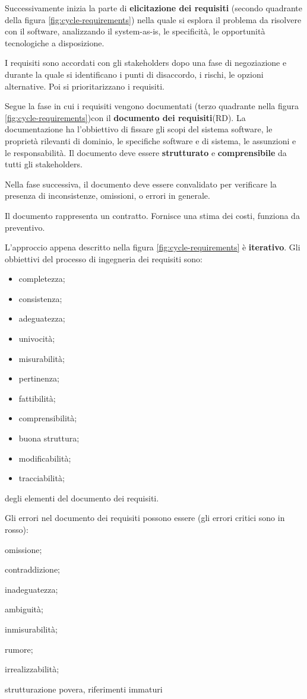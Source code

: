\documentclass[italian]{article}
\begin{document}
		 Successivamente inizia la parte di \textbf{elicitazione dei requisiti} (secondo quadrante della figura \ref{fig:cycle-requirements}) nella quale si esplora il problema da risolvere con il software, analizzando il system-as-is, le specificità, le opportunità tecnologiche a disposizione.

		 I requisiti sono accordati con gli stakeholders dopo una fase di negoziazione e durante la quale si identificano i punti di disaccordo, i rischi, le opzioni alternative. Poi si prioritarizzano i requisiti.

		 Segue la fase in cui i requisiti vengono documentati (terzo quadrante nella figura \ref{fig:cycle-requirements})con il \textbf{documento dei requisiti}(RD). La documentazione ha l'obbiettivo di fissare gli scopi del sistema software, le proprietà rilevanti di dominio, le specifiche software e di sistema, le assunzioni e le responsabilità. Il documento deve essere \textbf{strutturato} e \textbf{comprensibile} da tutti gli stakeholders.

		 Nella fase successiva, il documento deve essere convalidato per verificare la presenza di inconsistenze, omissioni, o errori in generale.

		 Il documento rappresenta un contratto. Fornisce una stima dei costi, funziona da preventivo.

		 L'approccio appena descritto nella figura \ref{fig:cycle-requirements} è \textbf{iterativo}.
		Gli obbiettivi del processo di ingegneria dei requisiti sono:
		\begin{itemize}

			\item completezza;
			\item consistenza;
			\item adeguatezza;
			\item univocità;
			\item misurabilità;
			\item pertinenza;
			\item fattibilità;
			\item comprensibilità;
			\item buona struttura;
			\item modificabilità;
			\item tracciabilità;
		\end{itemize}
		degli elementi del documento dei requisiti.

		Gli errori nel documento dei requisiti possono essere (gli errori critici sono in rosso):
		\begin{itemize}
			{\color{red}\item omissione;
			\item contraddizione;
			\item inadeguatezza;
			\item ambiguità;}
			\item inmisurabilità;
			\item rumore;
			\item irrealizzabilità;
			\item strutturazione povera, riferimenti immaturi
		\end{itemize}
\end{document}
